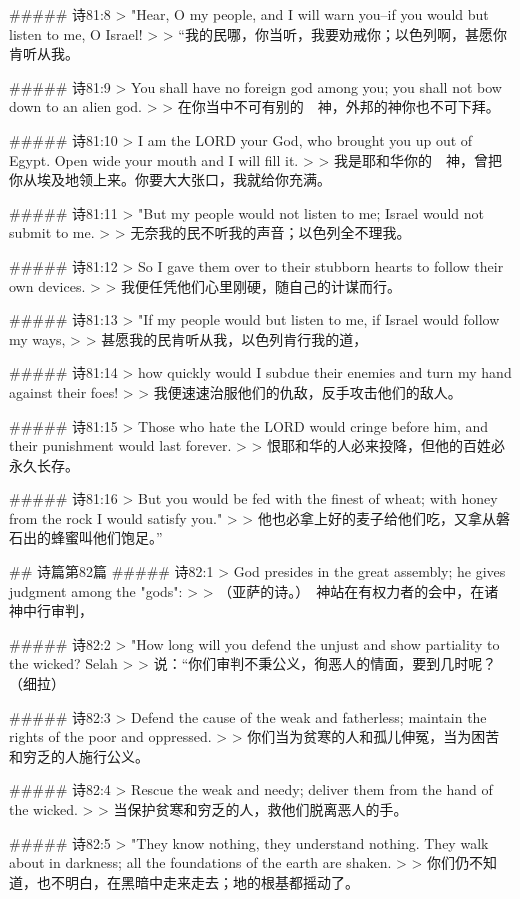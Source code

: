 ##### 诗81:8
> "Hear, O my people, and I will warn you--if you would but listen to me, O Israel!
>
> “我的民哪，你当听，我要劝戒你；以色列啊，甚愿你肯听从我。


##### 诗81:9
> You shall have no foreign god among you; you shall not bow down to an alien god.
>
> 在你当中不可有别的　神，外邦的神你也不可下拜。


##### 诗81:10
> I am the LORD your God, who brought you up out of Egypt. Open wide your mouth and I will fill it.
>
> 我是耶和华你的　神，曾把你从埃及地领上来。你要大大张口，我就给你充满。


##### 诗81:11
> "But my people would not listen to me; Israel would not submit to me.
>
> 无奈我的民不听我的声音；以色列全不理我。


##### 诗81:12
> So I gave them over to their stubborn hearts to follow their own devices.
>
> 我便任凭他们心里刚硬，随自己的计谋而行。


##### 诗81:13
> "If my people would but listen to me, if Israel would follow my ways,
>
> 甚愿我的民肯听从我，以色列肯行我的道，


##### 诗81:14
> how quickly would I subdue their enemies and turn my hand against their foes!
>
> 我便速速治服他们的仇敌，反手攻击他们的敌人。


##### 诗81:15
> Those who hate the LORD would cringe before him, and their punishment would last forever.
>
> 恨耶和华的人必来投降，但他的百姓必永久长存。


##### 诗81:16
> But you would be fed with the finest of wheat; with honey from the rock I would satisfy you."
>
> 他也必拿上好的麦子给他们吃，又拿从磐石出的蜂蜜叫他们饱足。”


## 诗篇第82篇
##### 诗82:1
> God presides in the great assembly; he gives judgment among the "gods":
>
> （亚萨的诗。）　神站在有权力者的会中，在诸　神中行审判，


##### 诗82:2
> "How long will you defend the unjust and show partiality to the wicked? Selah
>
> 说：“你们审判不秉公义，徇恶人的情面，要到几时呢？（细拉）


##### 诗82:3
> Defend the cause of the weak and fatherless; maintain the rights of the poor and oppressed.
>
> 你们当为贫寒的人和孤儿伸冤，当为困苦和穷乏的人施行公义。


##### 诗82:4
> Rescue the weak and needy; deliver them from the hand of the wicked.
>
> 当保护贫寒和穷乏的人，救他们脱离恶人的手。


##### 诗82:5
> "They know nothing, they understand nothing. They walk about in darkness; all the foundations of the earth are shaken.
>
> 你们仍不知道，也不明白，在黑暗中走来走去；地的根基都摇动了。



